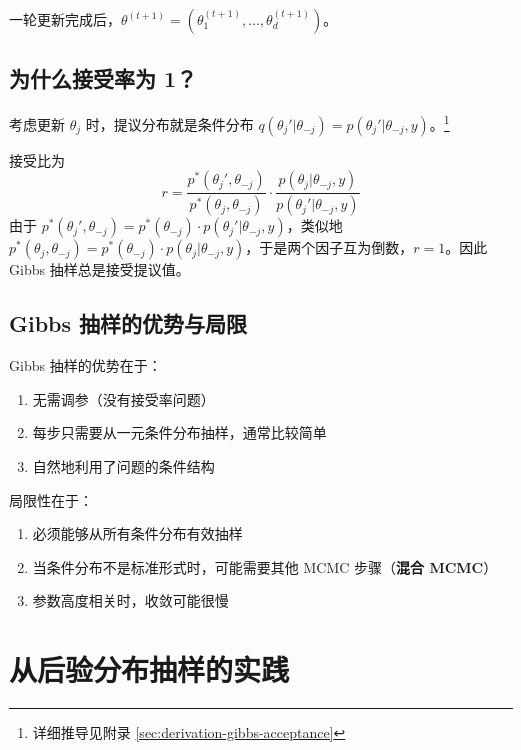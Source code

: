 一轮更新完成后，$\theta^{(t+1)} = (\theta_1^{(t+1)}, \ldots, \theta_d^{(t+1)})$。

\subsection{为什么接受率为 1？}

考虑更新 $\theta_j$ 时，提议分布就是条件分布 $q(\theta_j' | \theta_{-j}) = p(\theta_j' | \theta_{-j}, y)$。\footnote{详细推导见附录 \cref{sec:derivation-gibbs-acceptance}}

接受比为
\begin{equation}\label{eq:gibbs-acceptance-ratio}
r = \frac{p^*(\theta_j', \theta_{-j})}{p^*(\theta_j, \theta_{-j})} \cdot \frac{p(\theta_j | \theta_{-j}, y)}{p(\theta_j' | \theta_{-j}, y)}
\end{equation}
由于 $p^*(\theta_j', \theta_{-j}) = p^*(\theta_{-j}) \cdot p(\theta_j' | \theta_{-j}, y)$，类似地 $p^*(\theta_j, \theta_{-j}) = p^*(\theta_{-j}) \cdot p(\theta_j | \theta_{-j}, y)$，于是两个因子互为倒数，$r = 1$。因此 Gibbs 抽样总是接受提议值。

\subsection{Gibbs 抽样的优势与局限}

\begin{Remark}
  Gibbs 抽样的优势在于：
  \begin{enumerate}
    \item 无需调参（没有接受率问题）
    \item 每步只需要从一元条件分布抽样，通常比较简单
    \item 自然地利用了问题的条件结构
  \end{enumerate}

  局限性在于：
  \begin{enumerate}
    \item 必须能够从所有条件分布有效抽样
    \item 当条件分布不是标准形式时，可能需要其他 MCMC 步骤（\textbf{混合 MCMC}）
    \item 参数高度相关时，收敛可能很慢
  \end{enumerate}
\end{Remark}

\section{从后验分布抽样的实践}

